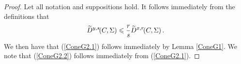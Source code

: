 \documentclass[11pt]{article}
\newtheorem{lemma}[theorem]{Lemma}
\theoremstyle{definition}
\numberwithin{equation}{section}
\newcommand{\D}[3]{D^{#1}\hspace{-3 pt}\left(#2,#3\right)}
\newcommand{\Da}[3]{\twid{D}^{#1}\hspace{-3 pt}\left(#2,#3\right)}
\newcommand{\sleq}{\leqslant}
\newcommand{\twid}[1]{\widetilde{#1}}
\begin{document}
\begin{proof}
Let all notation and suppositions hold. It follows immediately from the definitions that
\begin{equation}\label{ConeG2.3}
\Da{y,s} C\Sigma \sleq \frac rs \Da{x,r} C\Sigma.
\end{equation}
We then have that (\ref{ConeG2.1}) follows immediately by Lemma \ref{ConeG1}.
We note that (\ref{ConeG2.2}) follows immediately from (\ref{ConeG2.1}).

\end{proof}

\end{document}
